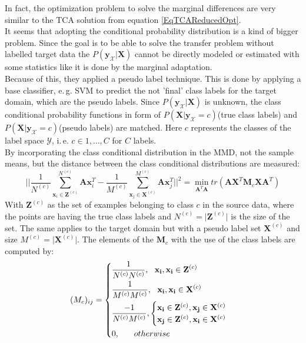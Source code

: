 In fact, the optimization problem to solve the marginal differences are very similar to the \acs{TCA} solution from equation \eqref{EqTCAReducedOpt}.\cite{Pan.2011}\\
It seems that adopting the conditional probability distribution is a kind of bigger problem.
Since the goal is to be able to solve the transfer problem without labelled target data the $P(\mathbf{y}_\mathcal{X}\vert \mathbf{X})$ cannot be directly modeled or estimated with some statistics like it is done by the marginal adaptation.\cite{Long.}\\
Because of this, they applied a pseudo label technique.
This is done by applying a base classifier, e.\,g. \acs{SVM} to predict the not 'final' class labels for the target domain, which are the pseudo labels.
Since $P(\mathbf{y}_\mathcal{X}\vert \mathbf{X})$ is unknown, the class conditional probability functions in form of $P(\mathbf{X}\vert \mathbf{y}_\mathcal{X}=c)$(true class labels) and $P(\mathbf{X}\vert \mathbf{y}_\mathcal{X}=c)$(pseudo labels) are matched.
Here $c$ represents the classes of the label space $\mathcal{Y}$, i.\,e. $c\in{1,\dots,C}$ for $C$ labels.\cite{Long.}\\
By incorporating the class conditional distribution in the \acl{MMD}, not the sample means, but the distance between the class conditional distributions are measured:\cite{Long.}
\begin{equation}\label{EqJDAConditionalOpt}
\bigg|\bigg| \frac{1}{N^{(c)}} \sum_{\mathbf{x}_i \in \mathbf{Z}^{(c)}}^{N^{(c)}}\mathbf{A}\mathbf{x}_i^T- \frac{1}{M^{(c)}} \sum_{\mathbf{x}_j \in \mathbf{X}^{(c)}}^{M^{(c)}}\mathbf{A}\mathbf{x}_j^T \bigg|\bigg|^2 = \min_{\mathbf{A}^T\mathbf{A}} tr(\mathbf{A}\mathbf{X}^T\mathbf{M}_c\mathbf{X}\mathbf{A}^T)
\end{equation}
With  $\mathbf{Z}^{(c)}$ as the set of examples belonging to class $c$ in the source data, where the points are having the true class labels and $N^{(c)} = \vert\mathbf{Z}^{(c)}\vert$ is the size of the set.
The same applies to the target domain but with a pseudo label set $\mathbf{X}^{(c)}$ and size $M^{(c)} = \vert\mathbf{X}^{(c)}\vert$.
The elements of the $\mathbf{M}_c$ with the use of the class labels are computed by: \cite{Long.}
\begin{equation}\label{EqJDAMMDPseudoMatrix}
(M_c)_{ij}= \begin{dcases}
\frac{1}{N^{(c)} N^{(c)} },\>\>\> \mathbf{x_i},\mathbf{x_i} \in \mathbf{Z}^{(c)} \\
\frac{1}{M^{(c)}  M^{(c)}  },\>\>\> \mathbf{x_i},\mathbf{x_i} \in \mathbf{X}^{(c)} \\
\frac{-1}{N ^{(c)} M ^{(c)} }, \begin{cases}
\mathbf{x_i} \in \mathbf{Z}^{(c)}, \mathbf{x_j} \in \mathbf{X}^{(c)}\\
\mathbf{x_j} \in \mathbf{Z}^{(c)}, \mathbf{x_i} \in \mathbf{X}^{(c)}\\
\end{cases}\\
0,\>\>\>\>\>\>\>\> otherwise
\end{dcases}
\end{equation}
